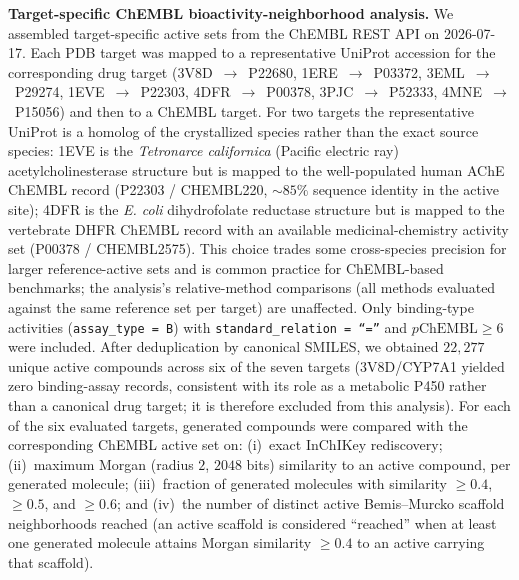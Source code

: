 \documentclass[journal=jcisd8,manuscript=article]{achemso}
\begin{document}
\textbf{Target-specific ChEMBL bioactivity-neighborhood analysis.} We assembled target-specific active sets from the ChEMBL REST API on 2026-07-17.\cite{zdrazil2024chembl} Each PDB target was mapped to a representative UniProt accession for the corresponding drug target (3V8D~$\to$~P22680, 1ERE~$\to$~P03372, 3EML~$\to$~P29274, 1EVE~$\to$~P22303, 4DFR~$\to$~P00378, 3PJC~$\to$~P52333, 4MNE~$\to$~P15056) and then to a ChEMBL target. For two targets the representative UniProt is a homolog of the crystallized species rather than the exact source species: 1EVE is the \emph{Tetronarce californica} (Pacific electric ray) acetylcholinesterase structure but is mapped to the well-populated human AChE ChEMBL record (P22303 / CHEMBL220, $\sim 85\%$ sequence identity in the active site); 4DFR is the \emph{E. coli} dihydrofolate reductase structure but is mapped to the vertebrate DHFR ChEMBL record with an available medicinal-chemistry activity set (P00378 / CHEMBL2575). This choice trades some cross-species precision for larger reference-active sets and is common practice for ChEMBL-based benchmarks; the analysis's relative-method comparisons (all methods evaluated against the same reference set per target) are unaffected. Only binding-type activities (\texttt{assay\_type = B}) with \texttt{standard\_relation = ``=''} and $p\mathrm{ChEMBL} \geq 6$ were included. After deduplication by canonical SMILES, we obtained $22{,}277$ unique active compounds across six of the seven targets (3V8D/CYP7A1 yielded zero binding-assay records, consistent with its role as a metabolic P450 rather than a canonical drug target; it is therefore excluded from this analysis). For each of the six evaluated targets, generated compounds were compared with the corresponding ChEMBL active set on: (i)~exact InChIKey rediscovery; (ii)~maximum Morgan (radius $2$, $2048$ bits) similarity to an active compound, per generated molecule; (iii)~fraction of generated molecules with similarity $\geq 0.4$, $\geq 0.5$, and $\geq 0.6$; and (iv)~the number of distinct active Bemis--Murcko scaffold neighborhoods reached (an active scaffold is considered ``reached'' when at least one generated molecule attains Morgan similarity $\geq 0.4$ to an active carrying that scaffold).
\end{document}
